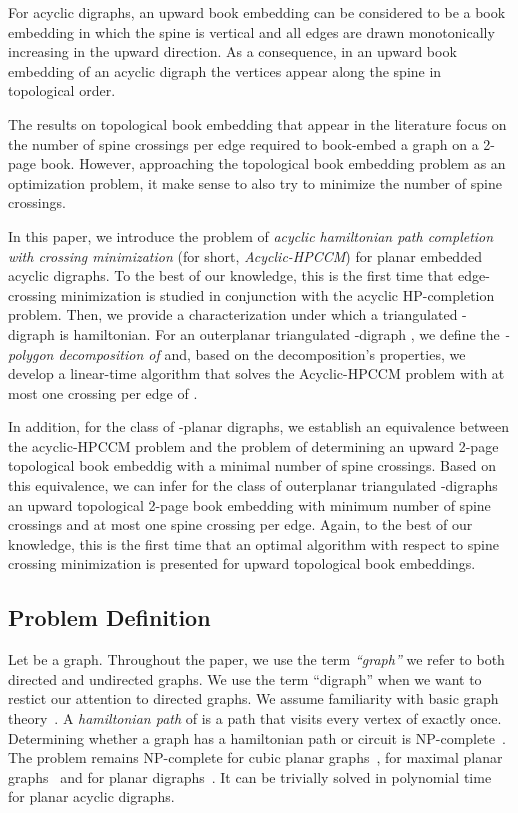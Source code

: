\documentclass{myllncs-mixalis}
\begin{document}
For acyclic digraphs, an upward book embedding can be considered to
be a book embedding in which the spine is vertical and all edges are
drawn monotonically increasing in the upward direction. As a
consequence, in an upward book embedding of an acyclic digraph the
vertices appear along the spine in topological order.

The results on topological book embedding that appear in the
literature focus on the number of spine crossings per edge required
to book-embed a graph on a 2-page book. However, approaching the
topological book embedding problem as an optimization problem, it
make sense to also try to minimize the number of spine crossings.

In this paper, we introduce the problem of \emph{acyclic hamiltonian
path completion with crossing minimization} (for short,
\emph{Acyclic-HPCCM}) for planar embedded acyclic digraphs. To the
best of our knowledge, this is the first time that edge-crossing
minimization is studied in conjunction with the acyclic
HP-completion problem. Then, we provide a characterization under
which a triangulated -digraph is hamiltonian. For an outerplanar
triangulated -digraph , we define the \emph{-polygon
decomposition of } and, based on the decomposition's properties,
we develop a linear-time algorithm that solves the Acyclic-HPCCM
problem with at most one crossing per edge of .

In addition, for the class of -planar digraphs, we establish an
equivalence between the acyclic-HPCCM problem and the problem of
determining an upward 2-page topological book embeddig with a
minimal number of spine crossings. Based on this equivalence, we can
infer  for the class of outerplanar triangulated -digraphs an
upward topological 2-page book embedding with minimum number of
spine crossings and at most one spine crossing per edge. Again, to
the best of our knowledge, this is the first time that an optimal
algorithm with respect to spine crossing minimization is presented
for upward topological book embeddings.

\subsection{Problem Definition}
\label{sec:problemDefinition}
 Let  be a  graph. Throughout
the paper, we use the term \emph{``graph''} we refer to both
directed and undirected graphs. We use the term ``digraph'' when we
want to restict our attention to directed graphs. We assume
familiarity with basic graph theory~\cite{Harary72,Diestel05}. A
\emph{hamiltonian path} of  is a  path that visits every vertex
of  exactly once. Determining whether a graph has a hamiltonian
path or circuit is NP-complete~\cite{GareyJS74}. The problem remains
NP-complete for cubic planar graphs~\cite{GareyJS74}, for maximal
planar graphs~\cite{Wigderson82}  and for planar
digraphs~\cite{GareyJS74}. It can be trivially solved in polynomial
time for planar acyclic digraphs.
\end{document}
